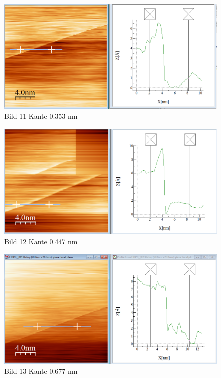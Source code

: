 \documentclass[10pt,a4paper]{article}
\begin{document}
\begin{figure}[]
	\includegraphics[scale = 0.2]{bild11.png}
	\centering
	\caption{Bild 11 Kante 0.353 nm}
	\label{b11}
\end{figure}
\begin{figure}[]
	\includegraphics[scale = 0.2]{bild12.png}
	\centering
	\caption{Bild 12 Kante 0.447 nm}
	\label{b12}
\end{figure}

\begin{figure}[]
	\includegraphics[scale = 0.2]{bild13.png}
	\centering
	\caption{Bild 13 Kante 0.677 nm}
	\label{b13}
\end{figure}
\end{document}
